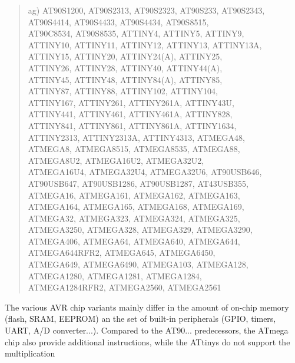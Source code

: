 \documentclass[12pt,twoside]{report}
\begin{document}
\begin{quote}
ag) AT90S1200, AT90S2313, AT90S2323, AT90S233, AT90S2343,\\
    AT90S4414, AT90S4433, AT90S4434, AT90S8515,\\
    AT90C8534, AT90S8535, ATTINY4, ATTINY5, ATTINY9,\\
    ATTINY10, ATTINY11, ATTINY12, ATTINY13, ATTINY13A,\\
    ATTINY15, ATTINY20, ATTINY24(A), ATTINY25,\\
    ATTINY26, ATTINY28, ATTINY40, ATTINY44(A),\\
    ATTINY45, ATTINY48, ATTINY84(A), ATTINY85,\\
    ATTINY87, ATTINY88, ATTINY102, ATTINY104,\\
    ATTINY167, ATTINY261, ATTINY261A, ATTINY43U,\\
    ATTINY441, ATTINY461, ATTINY461A, ATTINY828,\\
    ATTINY841, ATTINY861, ATTINY861A, ATTINY1634,\\
    ATTINY2313, ATTINY2313A, ATTINY4313, ATMEGA48,\\
    ATMEGA8, ATMEGA8515, ATMEGA8535, ATMEGA88,\\
    ATMEGA8U2, ATMEGA16U2, ATMEGA32U2,\\
    ATMEGA16U4, ATMEGA32U4, ATMEGA32U6, AT90USB646,\\
    AT90USB647, AT90USB1286, AT90USB1287, AT43USB355,\\
    ATMEGA16, ATMEGA161, ATMEGA162, ATMEGA163,\\
    ATMEGA164, ATMEGA165, ATMEGA168, ATMEGA169,\\
    ATMEGA32, ATMEGA323, ATMEGA324, ATMEGA325,\\
    ATMEGA3250, ATMEGA328, ATMEGA329, ATMEGA3290,\\
    ATMEGA406, ATMEGA64, ATMEGA640, ATMEGA644,\\
    ATMEGA644RFR2, ATMEGA645, ATMEGA6450,\\
    ATMEGA649, ATMEGA6490, ATMEGA103, ATMEGA128,\\
    ATMEGA1280, ATMEGA1281, ATMEGA1284,\\
    ATMEGA1284RFR2, ATMEGA2560, ATMEGA2561
\end{quote}
The various AVR chip variants mainly differ in the amount of
on-chip memory (flash, SRAM, EEPROM) an the set of built-in
peripherals (GPIO, timers, UART, A/D converter...).  Compared to
the AT90... predecessors, the ATmega chip also provide additional
instructions, while the ATtinys do not support the multiplication
\end{document}
